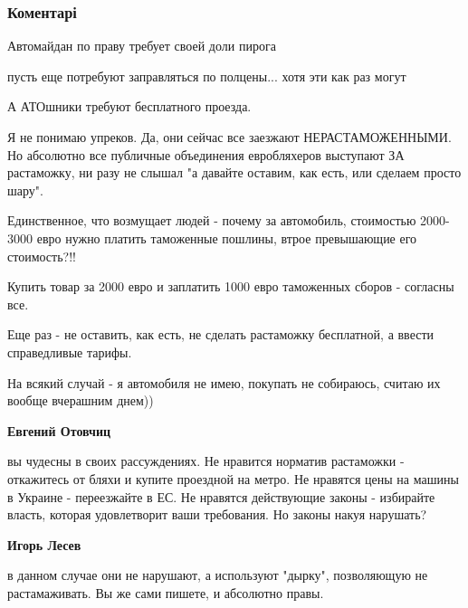  
 
 
 
 
\subsubsection{Коментарі}

\begin{itemize} %
Автомайдан по праву требует своей доли пирога

\begin{itemize} %
пусть еще потребуют заправляться по полцены... хотя эти как раз могут

А АТОшники требуют бесплатного проезда.


Я не понимаю упреков. Да, они сейчас все заезжают НЕРАСТАМОЖЕННЫМИ. Но
абсолютно все публичные объединения евробляхеров выступают ЗА растаможку, ни
разу не слышал "а давайте оставим, как есть, или сделаем просто шару".

Единственное, что возмущает людей - почему за автомобиль, стоимостью 2000-3000
евро нужно платить таможенные пошлины, втрое превышающие его стоимость?!!

Купить товар за 2000 евро и заплатить 1000 евро таможенных сборов - согласны
все.

Еще раз - не оставить, как есть, не сделать растаможку бесплатной, а ввести
справедливые тарифы.

На всякий случай - я автомобиля не имею, покупать не собираюсь, считаю их
вообще вчерашним днем))

\textbf{Евгений Отовчиц} 

вы чудесны в своих рассуждениях. Не нравится норматив растаможки - откажитесь
от бляхи и купите проездной на метро. Не нравятся цены на машины в Украине -
переезжайте в ЕС. Не нравятся действующие законы - избирайте власть, которая
удовлетворит ваши требования. Но законы накуя нарушать?

\textbf{Игорь Лесев} 

в данном случае они не нарушают, а используют "дырку", позволяющую не
растамаживать. Вы же сами пишете, и абсолютно правы.


\end{itemize}
\end{itemize}
